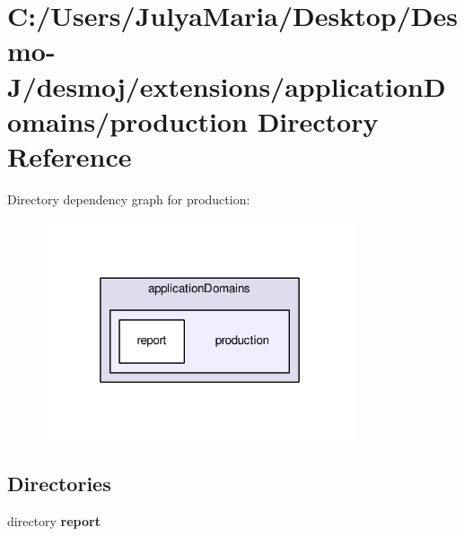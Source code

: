 \section{C\-:/\-Users/\-Julya\-Maria/\-Desktop/\-Desmo-\/\-J/desmoj/extensions/application\-Domains/production Directory Reference}
\label{dir_03b907249df54a02c7ff51bf3aeb42b6}
Directory dependency graph for production\-:
\nopagebreak
\begin{figure}[H]
\begin{center}
\leavevmode
\includegraphics[width=262pt]{dir_03b907249df54a02c7ff51bf3aeb42b6_dep}
\end{center}
\end{figure}
\subsection*{Directories}
\begin{DoxyCompactItemize}
\item 
directory {\bf report}
\end{DoxyCompactItemize}
